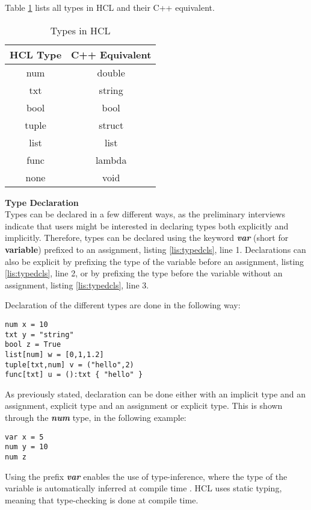 Table \ref{tbl:types} lists all types in HCL and their C++ equivalent.
\begin{table}[H]
	\centering
	\caption{Types in HCL}
	\label{tbl:types}
	\begin{tabular}{|c|c|}
		\hline
		HCL Type & C++ Equivalent \\ \hline
		num      & double         \\ \hline
		txt      & string         \\ \hline
		bool     & bool           \\ \hline
		tuple    & struct         \\ \hline
		list     & list           \\ \hline
		func     & lambda         \\ \hline
		none     & void           \\ \hline
	\end{tabular}
\end{table}
\textbf{Type Declaration}\\
Types can be declared in a few different ways, as the preliminary interviews indicate that users might be interested in declaring types both explicitly and implicitly.
Therefore, types can be declared using the keyword \textbf{\textit{var}} (short for \textbf{variable\textit{}}) prefixed to an assignment, listing \ref{lis:typedcls}, line 1.
Declarations can also be explicit by prefixing the type of the variable before an assignment, listing \ref{lis:typedcls}, line 2, or by prefixing the type before the variable without an assignment, listing \ref{lis:typedcls}, line 3.

Declaration of the different types are done in the following way:
\begin{lstlisting}[language=HCL,label=lis:typedcls,firstnumber=1]
num x = 10
txt y = "string"
bool z = True
list[num] w = [0,1,1.2]
tuple[txt,num] v = ("hello",2)
func[txt] u = ():txt { "hello" }
\end{lstlisting}

As previously stated, declaration can be done either with an implicit type and an assignment, explicit type and an assignment or explicit type.
This is shown through the \textbf{\textit{num}} type, in the following example:

\begin{lstlisting}[language=HCL,firstnumber=1]
var x = 5
num y = 10
num z

\end{lstlisting}

Using the prefix \textbf{\textit{var}} enables the use of type-inference, where the type of the variable is automatically inferred at compile time \cite{typeinf}.
HCL uses static typing, meaning that type-checking is done at compile time.

